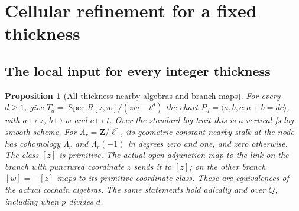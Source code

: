 \documentclass[11pt]{article}
\newtheorem{proposition}[theorem]{Proposition}
\theoremstyle{definition}
\theoremstyle{remark}
\newcommand{\Spec}{\operatorname{Spec}}
\begin{document}
\section{Cellular refinement for a fixed thickness}
\subsection{The local input for every integer thickness}
\begin{proposition}[All-thickness nearby algebras and branch maps]
\label{prop:all-thickness-nearby}
For every $d\geq1$, give $T_d=\Spec R[z,w]/(zw-t^d)$ the chart
$P_d=\langle a,b,c:a+b=dc\rangle$, with $a\mapsto z$, $b\mapsto w$
and $c\mapsto t$.  Over the standard log trait this is a vertical fs
log smooth scheme.  For $\Lambda_r=\mathbf Z/\ell^r$, its geometric
constant nearby stalk at the node has cohomology $\Lambda_r$ and
$\Lambda_r(-1)$ in degrees zero and one, and zero otherwise.  The
class $[z]$ is primitive.  The actual open-adjunction map to the link
on the branch with punctured coordinate $z$ sends it to $[z]$; on
the other branch $[w]=-[z]$ maps to its primitive coordinate class.
These are equivalences of the actual cochain algebras.  The same
statements hold adically and over $Q$, including when $p$ divides $d$.
\end{proposition}
\end{document}
